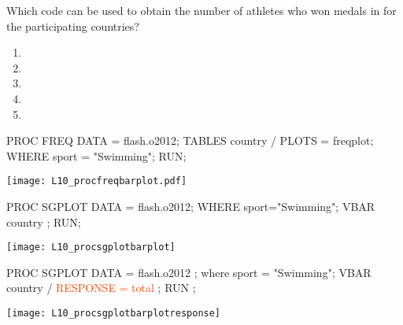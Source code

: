 \begin{frame}
\begin{clicker}{Which code can be used to obtain the number of athletes who won medals in  for the participating countries?}
\begin{enumerate}
\item {}
\item {}
\item {}
\item {}
\item {}
\end{enumerate}
\end{clicker}
\end{frame}


\begin{frame}[fragile]
\footnotesize
\begin{code}{.0}
PROC FREQ DATA = flash.o2012;
   TABLES country / PLOTS = freqplot;
   WHERE sport = "Swimming";
RUN;
\end{code}
\emp
\vspace{1ex}
\texttt{[image: L10\_procfreqbarplot.pdf]}
\emp
\end{frame}


\begin{frame}[fragile]
\footnotesize
\begin{code}{.0}
PROC SGPLOT DATA = flash.o2012;
	WHERE sport="Swimming";
	VBAR country ;
RUN;
\end{code}
\emp
\vspace{1ex}
\texttt{[image: L10\_procsgplotbarplot]}
\emp
\end{frame}

\begin{frame}[fragile]
\footnotesize
\begin{code}{.0}
PROC SGPLOT DATA = flash.o2012 ;
	where sport = "Swimming";
	VBAR country / \textcolor{OrangeRed}{RESPONSE = total} ;
RUN ;
\end{code}
\emp
\vspace{1ex}
\texttt{[image: L10\_procsgplotbarplotresponse]}
\emp
\end{frame}


